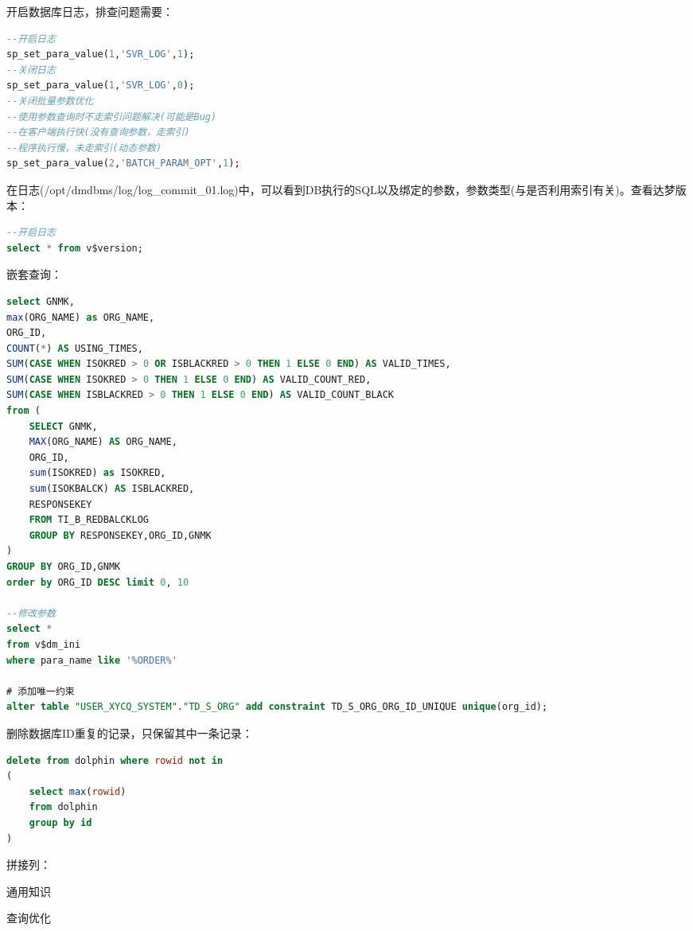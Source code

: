 \documentclass[12pt]{book}
\makeatletter
\numberwithin{dummy}{section}
\theoremstyle{ocrenumbox}
\theoremstyle{blacknumex}
\theoremstyle{blacknumbox}
\theoremstyle{ocrenum}
\renewcommand{\section}{\@startsection{section}{1}{\z@}
	{-4ex \@plus -1ex \@minus -.4ex}
	{1ex \@plus.2ex }
	{\normalfont\large\sffamily\bfseries}}
\renewcommand{\subsection}{\@startsection {subsection}{2}{\z@}
	{-3ex \@plus -0.1ex \@minus -.4ex}
	{0.5ex \@plus.2ex }
	{\normalfont\sffamily\bfseries}}
\makeatother
\begin{document}
开启数据库日志，排查问题需要：

\begin{lstlisting}[language=SQL]
--开启日志
sp_set_para_value(1,'SVR_LOG',1);
--关闭日志
sp_set_para_value(1,'SVR_LOG',0);
--关闭批量参数优化
--使用参数查询时不走索引问题解决(可能是Bug)
--在客户端执行快(没有查询参数，走索引)
--程序执行慢，未走索引(动态参数)
sp_set_para_value(2,'BATCH_PARAM_OPT',1);
\end{lstlisting}

在日志(/opt/dmdbms/log/log\_commit\_01.log)中，可以看到DB执行的SQL以及绑定的参数，参数类型(与是否利用索引有关)。查看达梦版本：

\begin{lstlisting}[language=SQL]
--开启日志
select * from v$version;
\end{lstlisting}

嵌套查询：

\begin{lstlisting}[language=SQL]
select GNMK,
max(ORG_NAME) as ORG_NAME,
ORG_ID,
COUNT(*) AS USING_TIMES,
SUM(CASE WHEN ISOKRED > 0 OR ISBLACKRED > 0 THEN 1 ELSE 0 END) AS VALID_TIMES,
SUM(CASE WHEN ISOKRED > 0 THEN 1 ELSE 0 END) AS VALID_COUNT_RED,
SUM(CASE WHEN ISBLACKRED > 0 THEN 1 ELSE 0 END) AS VALID_COUNT_BLACK
from (
	SELECT GNMK,
	MAX(ORG_NAME) AS ORG_NAME,
	ORG_ID,
	sum(ISOKRED) as ISOKRED,
	sum(ISOKBALCK) AS ISBLACKRED,
	RESPONSEKEY	
	FROM TI_B_REDBALCKLOG  
	GROUP BY RESPONSEKEY,ORG_ID,GNMK 
)
GROUP BY ORG_ID,GNMK 
order by ORG_ID DESC limit 0, 10

--修改参数
select * 
from v$dm_ini
where para_name like '%ORDER%'

# 添加唯一约束
alter table "USER_XYCQ_SYSTEM"."TD_S_ORG" add constraint TD_S_ORG_ORG_ID_UNIQUE unique(org_id);
\end{lstlisting}

删除数据库ID重复的记录，只保留其中一条记录：

\begin{lstlisting}[language=SQL]
delete from dolphin where rowid not in
(
	select max(rowid) 
	from dolphin 
	group by id
) 
\end{lstlisting}

拼接列：


\section{通用知识}

\subsection{查询优化}
\end{document}
